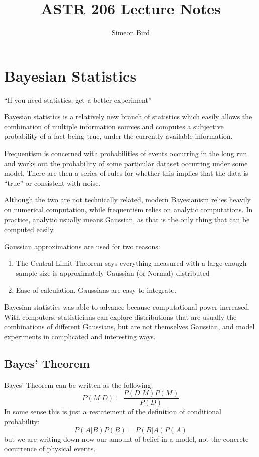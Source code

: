 \documentclass[12pt]{article}
\title{ASTR 206 Lecture Notes}
\author{Simeon Bird}
\begin{document}
\maketitle

\section{Bayesian Statistics}

``If you need statistics, get a better experiment''

Bayesian statistics is a relatively new branch of statistics which easily allows the combination of multiple information sources and computes a subjective probability of a fact being true, under the currently available information.

Frequentism is concerned with probabilities of events occurring in the long run and works out the probability of some particular dataset occurring under some model. There are then a series of rules for whether this implies that the data is ``true'' or consistent with noise.

Although the two are not technically related, modern Bayesianism relies heavily on numerical computation, while frequentism relies on analytic computations. In practice, analytic usually means Gaussian, as that is the only thing that can be computed easily.

Gaussian approximations are used for two reasons:
\begin{enumerate}
  \item The Central Limit Theorem says everything measured with a large enough sample size is approximately Gaussian (or Normal) distributed
  \item Ease of calculation. Gaussians are easy to integrate.
\end{enumerate}

Bayesian statistics was able to advance because computational power increased. With computers, statisticians can explore distributions that are usually the combinations of different Gaussians, but are not themselves Gaussian, and model experiments in complicated and interesting ways.

\subsection{Bayes' Theorem}
Bayes' Theorem can be written as the following:
\begin{equation}
    P(M|D) = \frac{P(D|M)P(M)}{P(D)}
\end{equation}
In some sense this is just a restatement of the definition of conditional probability:
\begin{equation}
    P(A|B)P(B) = P(B|A)P(A)
\end{equation}
but we are writing down now our amount of belief in a model, not the concrete occurrence of physical events.
\end{document}
